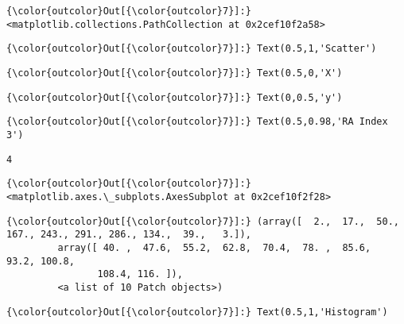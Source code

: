 \documentclass[11pt]{article}
\begin{document}
\begin{Verbatim}[commandchars=\\\{\}]
{\color{outcolor}Out[{\color{outcolor}7}]:} <matplotlib.collections.PathCollection at 0x2cef10f2a58>
\end{Verbatim}
            
\begin{Verbatim}[commandchars=\\\{\}]
{\color{outcolor}Out[{\color{outcolor}7}]:} Text(0.5,1,'Scatter')
\end{Verbatim}
            
\begin{Verbatim}[commandchars=\\\{\}]
{\color{outcolor}Out[{\color{outcolor}7}]:} Text(0.5,0,'X')
\end{Verbatim}
            
\begin{Verbatim}[commandchars=\\\{\}]
{\color{outcolor}Out[{\color{outcolor}7}]:} Text(0,0.5,'y')
\end{Verbatim}
            
\begin{Verbatim}[commandchars=\\\{\}]
{\color{outcolor}Out[{\color{outcolor}7}]:} Text(0.5,0.98,'RA Index 3')
\end{Verbatim}
            
    \begin{Verbatim}[commandchars=\\\{\}]
4

    \end{Verbatim}

\begin{Verbatim}[commandchars=\\\{\}]
{\color{outcolor}Out[{\color{outcolor}7}]:} <matplotlib.axes.\_subplots.AxesSubplot at 0x2cef10f2f28>
\end{Verbatim}
            
\begin{Verbatim}[commandchars=\\\{\}]
{\color{outcolor}Out[{\color{outcolor}7}]:} (array([  2.,  17.,  50., 167., 243., 291., 286., 134.,  39.,   3.]),
         array([ 40. ,  47.6,  55.2,  62.8,  70.4,  78. ,  85.6,  93.2, 100.8,
                108.4, 116. ]),
         <a list of 10 Patch objects>)
\end{Verbatim}
            
\begin{Verbatim}[commandchars=\\\{\}]
{\color{outcolor}Out[{\color{outcolor}7}]:} Text(0.5,1,'Histogram')
\end{Verbatim}
            
\end{document}
